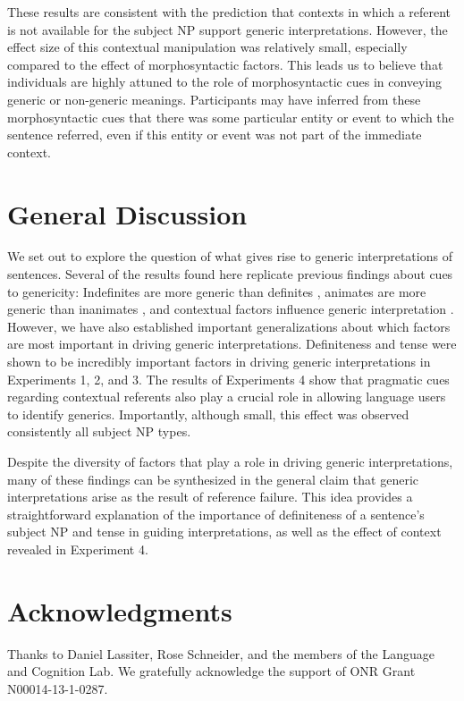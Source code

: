 \documentclass[10pt,letterpaper]{article}
\begin{document}
These results are consistent with the prediction that contexts in which a referent is not available for the subject NP support generic interpretations. However, the effect size of this contextual manipulation was relatively small, especially compared to the effect of morphosyntactic factors. This leads us to believe that individuals are highly attuned to the role of morphosyntactic cues in conveying generic or non-generic meanings. Participants may have inferred from these morphosyntactic cues that there was some particular entity or event to which the sentence referred, even if this entity or event was not part of the immediate context.

\section{General Discussion}

We set out to explore the question of what gives rise to generic interpretations of sentences. Several of the results found here replicate previous findings about cues to genericity: Indefinites are more generic than definites \cite{Cimpian:2011, Gelman:2003}, animates are more generic than inanimates \cite{Brandone:2009}, and contextual factors influence generic interpretation \cite{Gelman:2003}. However, we have also established important generalizations about which factors are most important in driving generic interpretations. Definiteness and tense were shown to be incredibly important factors in driving generic interpretations in Experiments 1, 2, and 3. The results of Experiments 4 show that pragmatic cues regarding contextual referents also play a crucial role in allowing language users to identify generics. Importantly, although small, this effect was observed consistently all subject NP types.

Despite the diversity of factors that play a role in driving generic interpretations, many of these findings can be synthesized in the general claim that generic interpretations arise as the result of reference failure. This idea provides a straightforward explanation of the importance of definiteness of a sentence's subject NP and tense in guiding interpretations, as well as the effect of context revealed in Experiment 4.

\section{Acknowledgments}

Thanks to Daniel Lassiter, Rose Schneider, and the members of the Language and Cognition Lab. We gratefully acknowledge the support of ONR Grant N00014-13-1-0287.



\setlength{\bibleftmargin}{.125in}
\setlength{\bibindent}{-\bibleftmargin}


\end{document}
